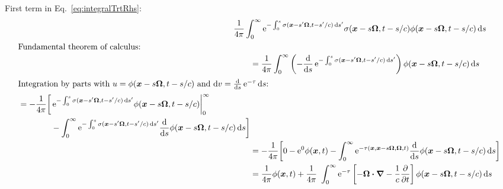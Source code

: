 \documentclass{beamer}
\newcommand{\epsiloncolor}[1]{\textcolor{blue}{#1}}
\begin{document}
\begin{frame}%
First term in Eq.~\eqref{eq:integralTrtRhs}:
\begin{align*}
\lefteqn{\frac{1}{4\pi}\int_{0}^{\infty} \eexp^{ -\int_{0}^{s}
  \sigma(\vec{x}-s'\vec{\Omega}, t-s'/c) \ud s'} \sigma(\vec{x} - s \vec{\Omega}, t-s/c)
\phi(\vec{x} - s \vec{\Omega}, t-s/c) \ud s}\qquad&
\\ 
\intertext{Fundamental theorem of calculus:}
&=\frac{1}{4\pi}\int_{0}^{\infty} \left( - \oder{}{s} \eexp^{ -\int_{0}^{s}
  \sigma(\vec{x}-s'\vec{\Omega}, t-s'/c) \ud s'}\right)
\phi(\vec{x} - s \vec{\Omega}, t-s/c) \ud s
\\
\intertext{Integration by parts with $u=\phi(\vec{x} - s \vec{\Omega}, t-s/c)$
and $\ud v = \oder{}{s} \eexp^{-\tau} \ud s$:}
    \begin{split}
  &=-\frac{1}{4\pi} \bigg[ 
\eexp^{- \int_{0}^{s} \sigma(\vec{x}-s'\vec{\Omega}, t-s'/c) \ud s'} 
\phi(\vec{x} - s \vec{\Omega}, t-s/c) \bigg|_{0}^{\infty}
\\
&\qquad\qquad- \int_{0}^{\infty} \eexp^{- \int_{0}^{s} \sigma(\vec{x}-s'\vec{\Omega}, t-s'/c) \ud s'}
\oder{}{s} \phi(\vec{x} - s \vec{\Omega}, t-s/c)
\ud s
  \bigg]
    \end{split}
  \\
  &=-\frac{1}{4\pi} \bigg[ 
0 -  
\eexp^0 \phi(\vec{x}, t)
- \int_{0}^{\infty} \eexp^{-\tau(\vec{x}, \vec{x} - s \vec{\Omega}, \vec{\Omega}, t)}
\oder{}{s} \phi(\vec{x} - s \vec{\Omega}, t-s/c)
\ud s
  \bigg]
 \\
 &=\frac{1}{4\pi}\phi(\vec{x}, t)
+ \frac{1}{4\pi}\ \int_{0}^{\infty} \eexp^{-\tau}
\left[ -\vec{\Omega} \vd \del - \frac1c \pder{}{t} \right] \phi(\vec{x} - s \vec{\Omega}, t-s/c)
\ud s
\end{align*}
\end{frame}
\end{document}
